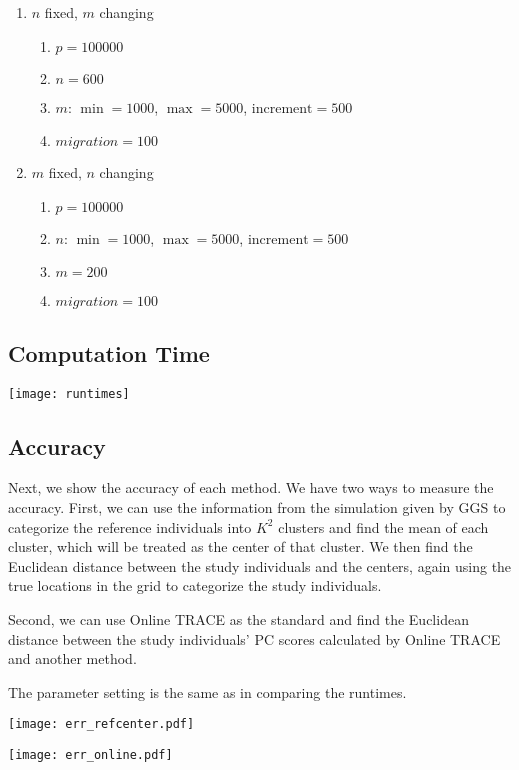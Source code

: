 \documentclass{article}[12pt]
\begin{document}
\begin{enumerate}
\item $n$ fixed, $m$ changing
\begin{enumerate}
\item $p = 100000$
\item $n = 600$
\item $m$: $\min = 1000$, $\max = 5000$, $\text{increment} = 500$ 
\item $migration = 100$
\end{enumerate}
\item $m$ fixed, $n$ changing
\begin{enumerate}
\item $p = 100000$
\item $n$: $\min = 1000$, $\max = 5000$, $\text{increment} = 500$ 
\item $m = 200$
\item $migration = 100$
\end{enumerate}
\end{enumerate}

\subsection{Computation Time}

\texttt{[image: runtimes]}

\subsection{Accuracy}

Next, we show the accuracy of each method.
We have two ways to measure the accuracy.
First, we can use the information from the simulation given by GGS to categorize the reference individuals into $K^2$ clusters and find the mean of each cluster,
which will be treated as the center of that cluster.
We then find the Euclidean distance between the study individuals and the centers,
again using the true locations in the grid to categorize the study individuals.

Second, we can use Online TRACE as the standard and find the Euclidean distance between the study individuals' PC scores calculated by Online TRACE and another method.

The parameter setting is the same as in comparing the runtimes.

\texttt{[image: err\_refcenter.pdf]}

\texttt{[image: err\_online.pdf]}
\end{document}
